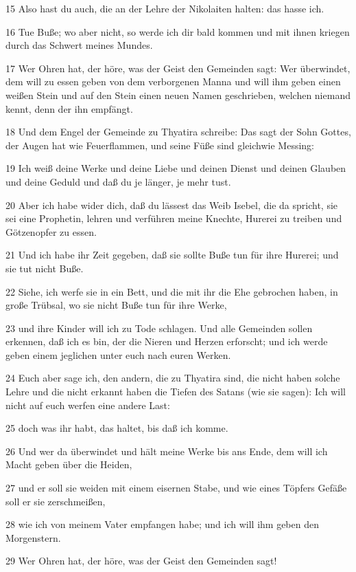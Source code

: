 \par 15 Also hast du auch, die an der Lehre der Nikolaiten halten: das hasse ich.
\par 16 Tue Buße; wo aber nicht, so werde ich dir bald kommen und mit ihnen kriegen durch das Schwert meines Mundes.
\par 17 Wer Ohren hat, der höre, was der Geist den Gemeinden sagt: Wer überwindet, dem will zu essen geben von dem verborgenen Manna und will ihm geben einen weißen Stein und auf den Stein einen neuen Namen geschrieben, welchen niemand kennt, denn der ihn empfängt.
\par 18 Und dem Engel der Gemeinde zu Thyatira schreibe: Das sagt der Sohn Gottes, der Augen hat wie Feuerflammen, und seine Füße sind gleichwie Messing:
\par 19 Ich weiß deine Werke und deine Liebe und deinen Dienst und deinen Glauben und deine Geduld und daß du je länger, je mehr tust.
\par 20 Aber ich habe wider dich, daß du lässest das Weib Isebel, die da spricht, sie sei eine Prophetin, lehren und verführen meine Knechte, Hurerei zu treiben und Götzenopfer zu essen.
\par 21 Und ich habe ihr Zeit gegeben, daß sie sollte Buße tun für ihre Hurerei; und sie tut nicht Buße.
\par 22 Siehe, ich werfe sie in ein Bett, und die mit ihr die Ehe gebrochen haben, in große Trübsal, wo sie nicht Buße tun für ihre Werke,
\par 23 und ihre Kinder will ich zu Tode schlagen. Und alle Gemeinden sollen erkennen, daß ich es bin, der die Nieren und Herzen erforscht; und ich werde geben einem jeglichen unter euch nach euren Werken.
\par 24 Euch aber sage ich, den andern, die zu Thyatira sind, die nicht haben solche Lehre und die nicht erkannt haben die Tiefen des Satans (wie sie sagen): Ich will nicht auf euch werfen eine andere Last:
\par 25 doch was ihr habt, das haltet, bis daß ich komme.
\par 26 Und wer da überwindet und hält meine Werke bis ans Ende, dem will ich Macht geben über die Heiden,
\par 27 und er soll sie weiden mit einem eisernen Stabe, und wie eines Töpfers Gefäße soll er sie zerschmeißen,
\par 28 wie ich von meinem Vater empfangen habe; und ich will ihm geben den Morgenstern.
\par 29 Wer Ohren hat, der höre, was der Geist den Gemeinden sagt!

